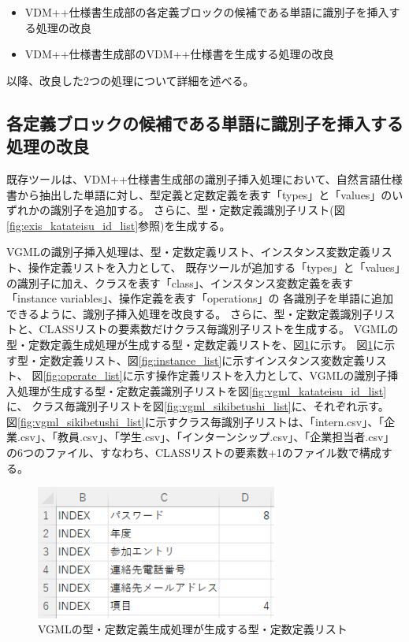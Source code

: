 \begin{itemize}
    \item VDM++仕様書生成部の各定義ブロックの候補である単語に識別子を挿入する処理の改良
    \item VDM++仕様書生成部のVDM++仕様書を生成する処理の改良
\end{itemize}

以降、改良した2つの処理について詳細を述べる。

\subsection{各定義ブロックの候補である単語に識別子を挿入する処理の改良}
既存ツールは、VDM++仕様書生成部の識別子挿入処理において、自然言語仕様書から抽出した単語に対し、型定義と定数定義を表す「types」と「values」のいずれかの識別子を追加する。
さらに、型・定数定義識別子リスト(図\ref{fig:exis_katateisu_id_list}参照)を生成する。

VGMLの識別子挿入処理は、型・定数定義リスト、インスタンス変数定義リスト、操作定義リストを入力として、
既存ツールが追加する「types」と「values」の識別子に加え、クラスを表す「class」、インスタンス変数定義を表す「instance variables」、操作定義を表す「operations」の
各識別子を単語に追加できるように、識別子挿入処理を改良する。
さらに、型・定数定義識別子リストと、CLASSリストの要素数だけクラス毎識別子リストを生成する。
VGMLの型・定数定義生成処理が生成する型・定数定義リストを、図\ref{fig:vgml_katateisu_list}に示す。
図\ref{fig:vgml_katateisu_list}に示す型・定数定義リスト、図\ref{fig:instance_list}に示すインスタンス変数定義リスト、
図\ref{fig:operate_list}に示す操作定義リストを入力として、VGMLの識別子挿入処理が生成する型・定数定義識別子リストを図\ref{fig:vgml_katateisu_id_list}に、
クラス毎識別子リストを図\ref{fig:vgml_sikibetushi_list}に、それぞれ示す。
図\ref{fig:vgml_sikibetushi_list}に示すクラス毎識別子リストは、「intern.csv」、「企業.csv」、「教員.csv」、「学生.csv」、「インターンシップ.csv」、「企業担当者.csv」
の6つのファイル、すなわち、CLASSリストの要素数+1のファイル数で構成する。

\begin{figure}[t]
    \begin{center}
        \includegraphics[width=300]{image/vgml_katateisu_list.png}
        \caption{VGMLの型・定数定義生成処理が生成する型・定数定義リスト}
        \label{fig:vgml_katateisu_list}
    \end{center}
\end{figure}


